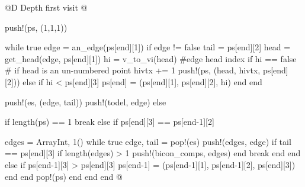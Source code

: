 \documentclass[10pt,oneside]{article}
\begin{document}
@D Depth first visit
@{push!(ps, (1,1,1))

while true
    edge = an_edge(ps[end][1])
    if edge != false
        tail = ps[end][2]
        head = get_head(edge, ps[end][1])
        hi = v_to_vi(head)  #edge head index
        if hi == false  # if head is an un-numbered point
            hivtx += 1
            push!(ps, (head, hivtx, ps[end][2]))
        else
            if hi < ps[end][3]
                ps[end] = (ps[end][1], ps[end][2], hi)
            end
        end

        push!(es, (edge, tail))
        push!(todel, edge)
    else

        if length(ps) == 1
            break
        else
            if ps[end][3] == ps[end-1][2]
                
                edges = Array{Int, 1}()
                while true
                    edge, tail = pop!(es)
                    push!(edges, edge)
                    if tail == ps[end][3]
                        if length(edges) > 1
                            push!(bicon_comps, edges)
                        end
                        break
                    end
                end
            else
                if ps[end-1][3] > ps[end][3]
                    ps[end-1] = (ps[end-1][1], ps[end-1][2], ps[end][3])
                end
            end
            pop!(ps)
        end
    end
end
@}

\end{document}
